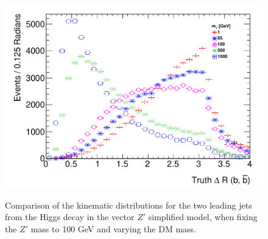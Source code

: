 \begin{figure}[hbpt!]
{		\includegraphics[width=0.47\linewidth]{figures/EW/monoH/zpzp100/truth_bb_deltar} %
	}
	\hfill
	\caption{Comparison of the kinematic distributions for the two leading jets from the Higgs decay in the vector $Z'$ simplified model, 
		when fixing the $Z'$ mass to 100 GeV and varying the DM mass. 
		\label{fig:VectorHbb_100}}
\end{figure}

